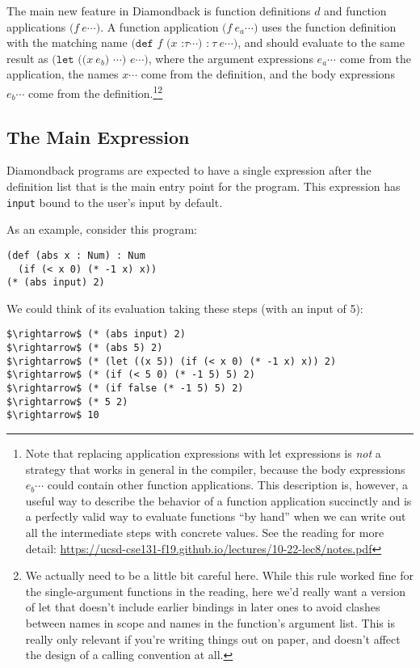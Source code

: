 \documentclass[10pt, oneside]{article}
\begin{document}
The main new feature in Diamondback is function definitions $d$ and function
applications $\texttt{($f\ e\cdots$)}$. A function application $\texttt{($f\
e_a\cdots$)}$ uses the function definition with the matching name
$\texttt{(def $f$ ($x$ :$\tau \cdots$) :$\ \tau\ e \cdots$)}$, and should evaluate to
the same result as $\texttt{(let (($x\ e_b$) $\cdots$) $e \cdots$)}$, where
the argument expressions $e_a\cdots$ come from the application, the names
$x\cdots$ come from the definition, and the body expressions $e_b\cdots$ come
from the definition.\footnote{Note that replacing application expressions
with let expressions is \emph{not} a strategy that works in general in the
compiler, because the body expressions $e_b\cdots$ could contain other
function applications. This description is, however, a useful way to describe
the behavior of a function application succinctly and is a perfectly valid
way to evaluate functions ``by hand'' when we can write out all the
intermediate steps with concrete values. See the reading for more detail:
\url{https://ucsd-cse131-f19.github.io/lectures/10-22-lec8/notes.pdf}}\footnote{We
actually need to be a little bit careful here. While this rule worked fine
for the single-argument functions in the reading, here we'd really want a
version of let that doesn't include earlier bindings in later ones to avoid
clashes between names in scope and names in the function's argument list.
This is really only relevant if you're writing things out on paper, and
doesn't affect the design of a calling convention at all.}

\subsection*{The Main Expression}

Diamondback programs are expected to have a single expression after the
definition list that is the main entry point for the program. This expression
has {\tt input} bound to the user's input by default.

As an example, consider this program:

\begin{lstlisting}
(def (abs x : Num) : Num
  (if (< x 0) (* -1 x) x))
(* (abs input) 2)
\end{lstlisting}

We could think of its evaluation taking these steps (with an input of 5):

\begin{lstlisting}
$\rightarrow$ (* (abs input) 2)
$\rightarrow$ (* (abs 5) 2)
$\rightarrow$ (* (let ((x 5)) (if (< x 0) (* -1 x) x)) 2)
$\rightarrow$ (* (if (< 5 0) (* -1 5) 5) 2)
$\rightarrow$ (* (if false (* -1 5) 5) 2)
$\rightarrow$ (* 5 2)
$\rightarrow$ 10
\end{lstlisting}
\end{document}

